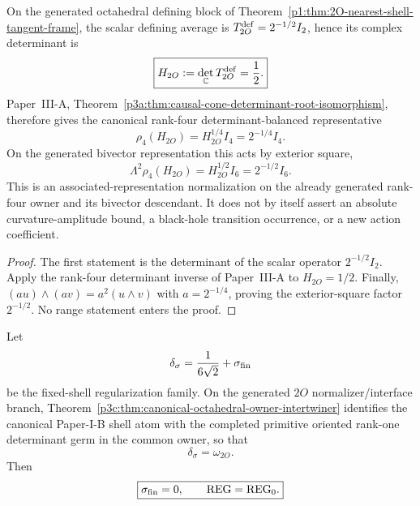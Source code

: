 \documentclass[12pt,a4paper]{article}
\begin{document}
\begin{corollary}
\label{p3c:cor:v2184-octahedral-quarterroot-bivector-half-character}
On the generated octahedral defining block of
Theorem~\ref{p1:thm:2O-nearest-shell-tangent-frame}, the scalar defining
average is \(T_{2O}^{\rm def}=2^{-1/2}I_2\), hence its complex determinant is
\begin{equation}
\label{p3c:eq:v2184-octahedral-H-half}
 \boxed{H_{2O}:=\det_{\mathbb C}T_{2O}^{\rm def}=\frac12.}
\end{equation}
Paper~III-A, Theorem~\ref{p3a:thm:causal-cone-determinant-root-isomorphism},
therefore gives the canonical rank-four determinant-balanced representative
\begin{equation}
\label{p3c:eq:v2184-octahedral-quarterroot}
 \boxed{\rho_4(H_{2O})=H_{2O}^{1/4}I_4=2^{-1/4}I_4.}
\end{equation}
On the generated bivector representation this acts by exterior square,
\begin{equation}
\label{p3c:eq:v2184-octahedral-bivector-half-character}
 \boxed{\Lambda^2\rho_4(H_{2O})=H_{2O}^{1/2}I_6=2^{-1/2}I_6.}
\end{equation}
This is an associated-representation normalization on the already generated
rank-four owner and its bivector descendant.  It does not by itself assert an
absolute curvature-amplitude bound, a black-hole transition occurrence, or a
new action coefficient.
\end{corollary}

\begin{proof}
The first statement is the determinant of the scalar operator
\(2^{-1/2}I_2\).  Apply the rank-four determinant inverse of Paper~III-A to
\(H_{2O}=1/2\).  Finally,
\((a u)\wedge(a v)=a^2(u\wedge v)\) with \(a=2^{-1/4}\), proving the
exterior-square factor \(2^{-1/2}\).  No range statement enters the proof.
\end{proof}

\begin{theorem}
\label{p3:prop:conditional-2O-owner-REG0-closure}
Let
\[
 \delta_\sigma=\frac1{6\sqrt2}+\sigma_{\rm fin}
\]
be the fixed-shell regularization family.  On the generated \(2O\)
normalizer/interface branch,
Theorem~\ref{p3c:thm:canonical-octahedral-owner-intertwiner} identifies the
canonical Paper-I-B shell atom with the completed primitive oriented rank-one
determinant germ in the common owner, so that
\begin{equation}
\label{p3:eq:conditional-2O-owner-bridge}
 \delta_\sigma=\omega_{2O}.
\end{equation}
Then
\begin{equation}
\label{p3:eq:conditional-REG0-closure}
 \boxed{\sigma_{\rm fin}=0,\qquad\mathrm{REG}=\mathrm{REG}_0.}
\end{equation}
\end{theorem}
\end{document}
